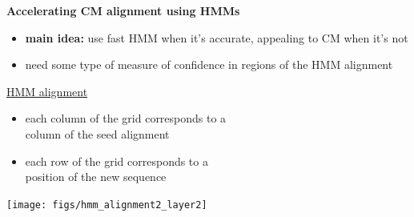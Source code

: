 \documentclass[landscape]{slides}
\begin{document}
\begin{slide}
\begin{center}
\large
\textbf{Accelerating CM alignment using HMMs}
\end{center}
\medskip
\begin{minipage}{6in}
\footnotesize
\begin{itemize}
\item
\textbf{main idea:} use fast HMM when it's accurate, appealing to CM when it's not
\item
need some type of measure of confidence in regions of the HMM alignment

\end{itemize}
\small
\hspace{0.3in}
\underline{HMM alignment}%
\begin{itemize}
\item
each column of the grid corresponds to a \\ column
of the seed alignment
\item
each row of the grid corresponds to a \\ position of the new sequence
\end{itemize}
\vspace{3in}
\end{minipage}
\begin{minipage}{4in}
\begin{center}
\texttt{[image: figs/hmm\_alignment2\_layer2]}
\end{center}
\vspace{1.5in}
\end{minipage}
\end{slide}
\end{document}
